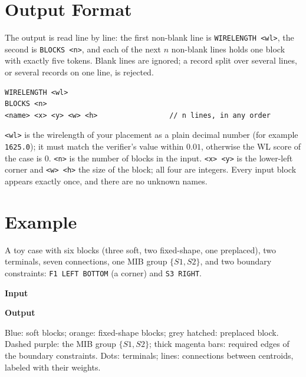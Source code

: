 \documentclass[11pt,a4paper]{article}
\newcommand{\kw}[1]{\texttt{#1}}
\begin{document}
\section{Output Format}

The output is read line by line: the first non-blank line is
\kw{WIRELENGTH <wl>}, the second is \kw{BLOCKS <n>}, and each of the next $n$
non-blank lines holds one block with exactly five tokens. Blank lines are
ignored; a record split over several lines, or several records on one line,
is rejected.

\begin{Verbatim}[frame=single,fontsize=\small]
WIRELENGTH <wl>
BLOCKS <n>
<name> <x> <y> <w> <h>                 // n lines, in any order
\end{Verbatim}

\kw{<wl>} is the wirelength of your placement as a plain decimal number (for
example \kw{1625.0}); it must match the verifier's value within $0.01$,
otherwise the WL score of the case is 0. \kw{<n>} is the number of blocks in
the input. \kw{<x> <y>} is the lower-left corner and \kw{<w> <h>} the size of
the block; all four are integers. Every input block appears exactly once, and
there are no unknown names.

\section{Example}
\label{sec:example}

A toy case with six blocks (three soft, two fixed-shape, one preplaced), two
terminals, seven connections, one MIB group $\{S1,S2\}$, and two boundary
constraints: \kw{F1 LEFT BOTTOM} (a corner) and \kw{S3 RIGHT}.

\begin{center}
\begin{minipage}[t]{0.46\textwidth}
\textbf{Input}
\end{minipage}\hfill
\begin{minipage}[t]{0.48\textwidth}
\textbf{Output}
\vspace{2pt}
\resizebox{\linewidth}{!}{}
{\footnotesize Blue: soft blocks; orange: fixed-shape blocks; grey hatched:
preplaced block. Dashed purple: the MIB group $\{S1,S2\}$; thick magenta bars:
required edges of the boundary constraints. Dots: terminals; lines:
connections between centroids, labeled with their weights.\par}
\end{minipage}
\end{center}
\end{document}
